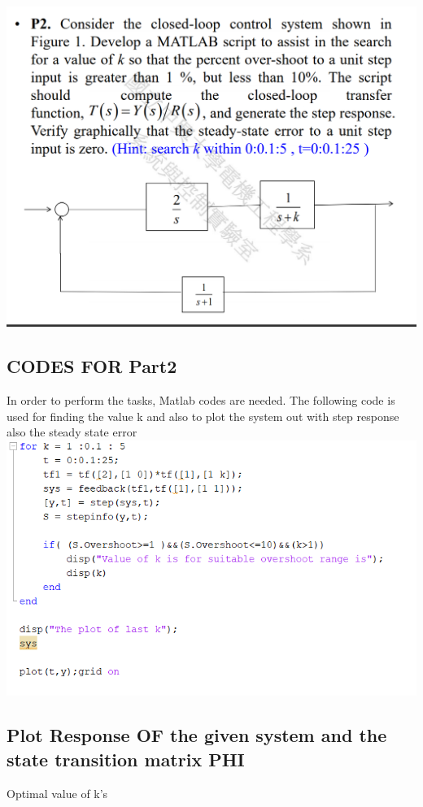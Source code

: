 \documentclass[12pt]{article}
\begin{document}
\includegraphics[scale=0.5]{../Lab8/Pictures/LabProblem2.png} \\


\cleardoublepage
\subsection{CODES FOR Part2}
In order to perform the tasks, Matlab codes are needed. The following code is used for finding the value k and also to plot the system out with step response also the steady state error \\

\includegraphics[scale=0.5]{../Lab8/Pictures/LabProblem2Code.png} 


\subsection{Plot Response OF the given system and the state transition matrix PHI} 
Optimal value of k's\\
\end{document}
